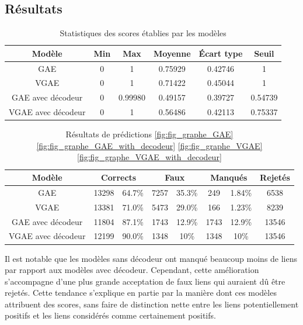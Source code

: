 \documentclass{article}
\begin{document}
\subsection{Résultats}

\begin{table}[H]
    \centering
    \begin{tabular}{|c|c|c|c|c|c|}
        \hline
        Modèle & Min & Max & Moyenne & Écart type & Seuil\\
        \hline
        GAE & 0 & 1 & 0.75929 & 0.42746 & 1\\
        VGAE & 0 & 1 & 0.71422 & 0.45044 & 1\\
        GAE avec décodeur & 0 & 0.99980 & 0.49157 & 0.39727 & 0.54739\\
        VGAE avec décodeur & 0 & 1 & 0.56486 & 0.42113 & 0.75337\\
        \hline
    \end{tabular}
    \caption{Statistiques des scores établies par les modèles}
    \label{tab:statistiques_scores}
\end{table}

\begin{table}[H]
    \centering
    \begin{tabular}{|c|c|c|c|c|c|c|c|}
        \hline
        Modèle & \multicolumn{2}{c|}{Corrects} & \multicolumn{2}{c|}{Faux} & \multicolumn{2}{c|}{Manqués} & Rejetés\\
        \hline
        GAE & 13298 & 64.7\% & 7257 & 35.3\% & 249 & 1.84\% & 6538\\
        VGAE & 13381 & 71.0\% & 5473 & 29.0\% & 166 & 1.23\% & 8239\\
        GAE avec décodeur & 11804 & 87.1\% & 1743 & 12.9\% & 1743 & 12.9\% & 13546\\
        VGAE avec décodeur & 12199 & 90.0\% & 1348 & 10\% & 1348 & 10\% & 13546\\
         \hline
    \end{tabular}
    \caption{Résultats de prédictions \ref{fig:fig_graphe_GAE} \ref{fig:fig_graphe_GAE_with_decodeur} \ref{fig:fig_graphe_VGAE} \ref{fig:fig_graphe_VGAE_with_decodeur}}
    \label{tab:resultats_reconstruction}
\end{table}

Il est notable que les modèles sans décodeur ont manqué beaucoup moins de liens par rapport aux modèles avec décodeur. Cependant, cette amélioration s'accompagne d'une plus grande acceptation de faux liens qui auraient dû être rejetés. Cette tendance s'explique en partie par la manière dont ces modèles attribuent des scores, sans faire de distinction nette entre les liens potentiellement positifs et les liens considérés comme certainement positifs.
\end{document}
